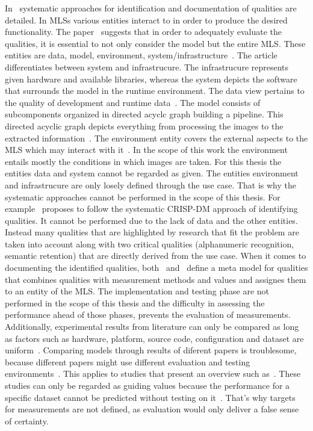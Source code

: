 In~\cite{nakamichi_requirements-driven_2020,siebert_construction_2021} systematic approaches for
identification and documentation of qualities are detailed.
In \acp{MLS} various entities interact to in order to produce the desired functionality.
The paper~\cite{nakamichi_requirements-driven_2020} suggests that in order to adequately evaluate
the qualities, it is essential to not only consider the model but the entire \ac{MLS}.
These entities are data, model, environment,
system/infrastructure~\citep{nakamichi_requirements-driven_2020, siebert_construction_2021}.
The article~\cite{siebert_construction_2021} differentiates between system and infrastrucure.
The infrastrucure represents given hardware and available libraries, whereas the system depicts
the software that surrounds the model in the runtime environment.
The data view pertains to the quality of development and runtime
data~\citep{siebert_construction_2021}.
The model consists of subcomponents organized in directed acyclc graph building a
pipeline.
This directed acyclic graph depicts everything from processing the images to the extracted
information~\citep{siebert_construction_2021}.
The environment entity covers the external aspects to the \ac{MLS} which may interact with
it~\citep{siebert_construction_2021}.
In the scope of this work the environment entails mostly the conditions in which images are taken.
For this thesis the entities data and system cannot be regarded as given.
The entities environment and infrastrucure are only losely defined through the use case.
That is why the systematic approaches cannot be performed in the scope of this thesis.
For example~\cite{siebert_construction_2021} proposes to follow the systematic CRISP-DM approach of
identifying qualities.
It cannot be performed due to the lack of data and the other entities.
Instead many qualities that are highlighted by research that fit the problem are taken into account
along with two critical qualities (alphanumeric recognition, semantic retention) that are directly
derived from the use case.
When it comes to documenting the identified qualities,
both~\cite{nakamichi_requirements-driven_2020} and~\cite{siebert_construction_2021} define a meta
model for qualities that combines qualities with
measurement methods and values and assignes them to an entity of the \ac{MLS}.
The implementation and testing phase are not performed in the scope of this thesis and the
difficulty in assessing the performance ahead of those phases, prevents the evaluation
of measurements.
Additionally, experimental results from literature can only be compared as long as factors such as
hardware, platform, source code, configuration and dataset are uniform~\citep{arpteg_software_2018}.
Comparing models through results of diferent papers is troublesome, because different papers
might use different evaluation and testing environments~\citep{baek_what_2019}.
This applies to studies that present an overview such as~\cite{chen_text_2021,long_scene_2021}.
These studies can only be regarded as guiding values because the performance for a specific dataset
cannot be predicted without testing on it~\cite{arpteg_software_2018}.
That's why targets for measurements are not defined, as evaluation would only deliver a false
sense of certainty.

